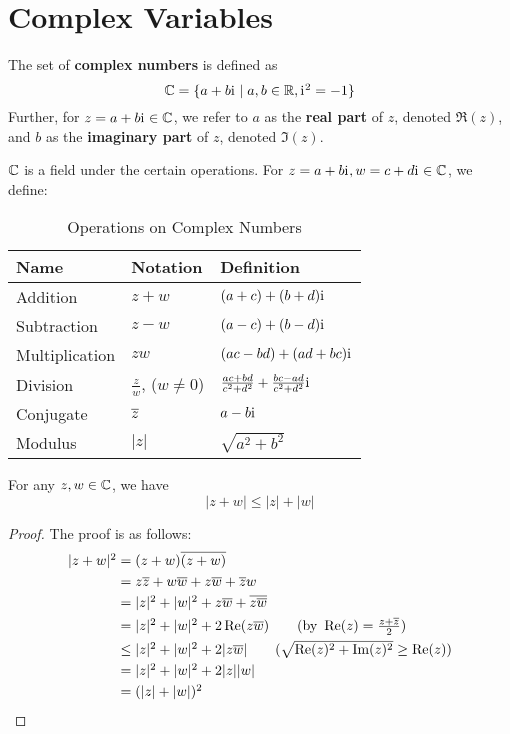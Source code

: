 \section{Complex Variables}

\begin{definition}
    The set of \textbf{complex numbers} is defined as
    \[
        \C = \set{a+b\iu\mid a,b\in\R, \iu^2=-1}
    \]
    Further, for $z=a+b\mathrm{i}\mkern1mu\in\mathbb{C}$, we refer to $a$ as the \textbf{real part} of $z$, denoted $\Re(z)$,
    and $b$ as the \textbf{imaginary part} of $z$, denoted $\Im(z)$.
\end{definition}

\begin{definition}
    $\mathbb{C}$ is a field under the certain operations. For $z=a+b\mathrm{i}\mkern1mu, w=c+d\mathrm{i}\mkern1mu\in\mathbb{C}$,
    we define:
    \begin{table}[H]
        \centering
        \begin{tabular}{lll}
            \textbf{Name} & \textbf{Notation} & \textbf{Definition} \\
            \hline
            Addition & $z+w$ & $(a+c) + (b+d)\mathrm{i}\mkern1mu$ \\
            Subtraction & $z-w$ & $(a-c) + (b-d)\mathrm{i}\mkern1mu$ \\
            Multiplication & $zw$ & $(ac - bd) + (ad + bc)\mathrm{i}\mkern1mu$ \\
            Division & $\displaystyle\frac{z}{w}$, ($w\neq 0$) & $\textstyle\frac{ac + bd}{c^2 + d^2} + \frac{bc - ad}{c^2 + d^2}\mathrm{i}\mkern1mu$ \\
            Conjugate & $\overline{z}$ & $a - b\mathrm{i}\mkern1mu$\\
            Modulus & $|z|$ & $\sqrt{a^2 + b^2}$
        \end{tabular}
        \caption{Operations on Complex Numbers}
    \end{table}
\end{definition}

\begin{theorem}
    For any $z,w\in\mathbb{C}$, we have
    \[
        |z+w| \leq |z| + |w|
    \]
    \begin{proof} The proof is as follows:
        \begin{align*}
            |z+w|^2 &= (z+w)\conj{(z+w)} \\
            &= z\conj{z} + w\conj{w} + z\conj{w} + \conj{z}w \\
            &= |z|^2 + |w|^2 + z\conj{w} + \conj{z\conj{w}} \\
            &= |z|^2 + |w|^2 + 2\Re(z\conj{w}) \qquad (\text{by }\Re(z) = \frac{z+\conj{z}}{2}) \\
            &\leq |z|^2 + |w|^2 + 2|z\conj{w}| \qquad (\sqrt{\Re(z)^2+\Im(z)^2}\geq \Re(z)) \\
            &= |z|^2 + |w|^2 + 2|z||w| \\
            &= (|z| + |w|)^2
        \end{align*}
    \end{proof}
\end{theorem}
\pagebreak

